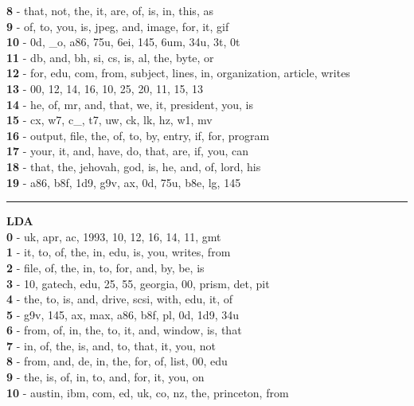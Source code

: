 \textbf{8} - that, not, the, it, are, of, is, in, this, as\\
\textbf{9} - of, to, you, is, jpeg, and, image, for, it, gif\\
\textbf{10} - 0d, \_o, a86, 75u, 6ei, 145, 6um, 34u, 3t, 0t\\
\textbf{11} - db, and, bh, si, cs, is, al, the, byte, or\\
\textbf{12} - for, edu, com, from, subject, lines, in, organization, article, writes\\
\textbf{13} - 00, 12, 14, 16, 10, 25, 20, 11, 15, 13\\
\textbf{14} - he, of, mr, and, that, we, it, president, you, is\\
\textbf{15} - cx, w7, c\_, t7, uw, ck, lk, hz, w1, mv\\
\textbf{16} - output, file, the, of, to, by, entry, if, for, program\\
\textbf{17} - your, it, and, have, do, that, are, if, you, can\\
\textbf{18} - that, the, jehovah, god, is, he, and, of, lord, his\\
\textbf{19} - a86, b8f, 1d9, g9v, ax, 0d, 75u, b8e, lg, 145\\
\hrule\vspace{2mm}
\noindent
\textbf{LDA}\vspace{2mm}\\
\vspace{2mm}
\noindent
\textbf{0} - uk, apr, ac, 1993, 10, 12, 16, 14, 11, gmt\\
\textbf{1} - it, to, of, the, in, edu, is, you, writes, from\\
\textbf{2} - file, of, the, in, to, for, and, by, be, is\\
\textbf{3} - 10, gatech, edu, 25, 55, georgia, 00, prism, det, pit\\
\textbf{4} - the, to, is, and, drive, scsi, with, edu, it, of\\
\textbf{5} - g9v, 145, ax, max, a86, b8f, pl, 0d, 1d9, 34u\\
\textbf{6} - from, of, in, the, to, it, and, window, is, that\\
\textbf{7} - in, of, the, is, and, to, that, it, you, not\\
\textbf{8} - from, and, de, in, the, for, of, list, 00, edu\\
\textbf{9} - the, is, of, in, to, and, for, it, you, on\\
\textbf{10} - austin, ibm, com, ed, uk, co, nz, the, princeton, from\\
